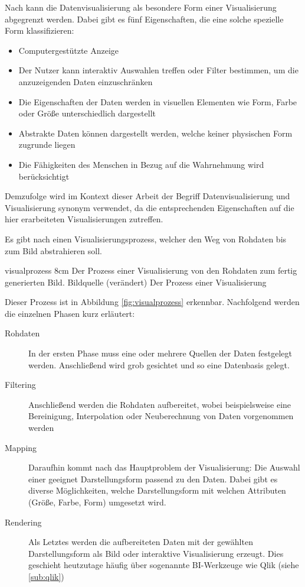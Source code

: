 Nach \cite{Card.2007} kann die Datenvisualisierung als besondere Form einer Visualisierung abgegrenzt werden.
Dabei gibt es fünf Eigenschaften, die eine solche spezielle Form klassifizieren:
\begin{itemize}
\item Computergestützte Anzeige 
\item Der Nutzer kann interaktiv Auswahlen treffen oder Filter bestimmen, um die anzuzeigenden Daten einzuschränken
\item Die Eigenschaften der Daten werden in visuellen Elementen wie Form, Farbe oder Größe unterschiedlich dargestellt
\item Abstrakte Daten können dargestellt werden, welche keiner physischen Form zugrunde liegen
\item Die Fähigkeiten des Menschen in Bezug auf die Wahrnehmung wird berücksichtigt 
\end{itemize}

Demzufolge wird im Kontext dieser Arbeit der Begriff Datenvisualisierung und Visualisierung synonym verwendet, da die entsprechenden Eigenschaften auf die hier erarbeiteten Visualisierungen zutreffen.

Es gibt nach \cite{Schumann.2000} einen \glqq Visualisierungsprozess\grqq{}, welcher den Weg von Rohdaten bis zum Bild abstrahieren soll.

\bild
{visualprozess}
{8cm}
{Der Prozess einer Visualisierung von den Rohdaten zum fertig generierten Bild. Bildquelle \cite[S.50]{FischerStabel.2018} (verändert)}
{Der Prozess einer Visualisierung}

Dieser Prozess ist in Abbildung \ref{fig:visualprozess} erkennbar.
Nachfolgend werden die einzelnen Phasen kurz erläutert:
\begin{description}
\item[Rohdaten] In der ersten Phase muss eine oder mehrere Quellen der Daten festgelegt werden. 
Anschließend wird grob gesichtet und so eine Datenbasis gelegt.
\item[Filtering] Anschließend werden die Rohdaten aufbereitet, wobei beispielsweise eine Bereinigung, Interpolation oder Neuberechnung von Daten vorgenommen werden
\item[Mapping] Daraufhin kommt nach \cite{FischerStabel.2018} das Hauptproblem der Visualisierung: Die Auswahl einer geeignet Darstellungsform passend zu den Daten. 
Dabei gibt es diverse Möglichkeiten, welche Darstellungsform mit welchen Attributen (Größe, Farbe, Form) umgesetzt wird. 
\item[Rendering] Als Letztes werden die aufbereiteten Daten mit der gewählten Darstellungsform als Bild oder interaktive Visualisierung erzeugt.
Dies geschieht heutzutage häufig über sogenannte \gls{BI}-Werkzeuge wie Qlik (siehe \ref{sub:qlik})
\end{description}




